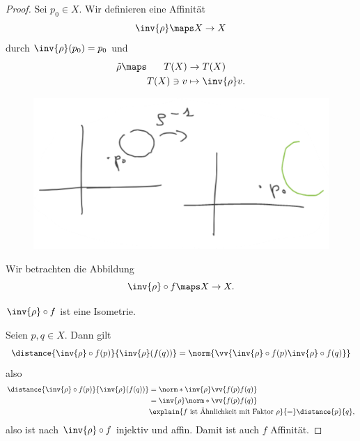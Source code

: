 \begin{proof}
  Sei \( p_0\in X \). Wir definieren eine Affinität
  \begin{equation*}
    \inv{\rho}\maps X\to X
  \end{equation*}
  durch \( \inv{\rho}(p_0)=p_0 \) und
  \begin{equation*}
    \tilde{\rho}\maps \begin{aligned}[t]
      T(X)&\to T(X)\\
      T(X)\ni v&\mapsto \inv{\rho}v.
    \end{aligned}
  \end{equation*}
  \begin{figure}[H]
    \centering
    \includegraphics[width=0.5\linewidth]{figures/aehnlichkeiten_sind_affinitaeten_beweis}
    \label{fig:aehnlichkeiten_sind_affinitaeten_beweis}
  \end{figure}
  Wir betrachten die Abbildung
  \begin{equation*}
    \inv{\rho}\circ f\maps X\to X.
  \end{equation*}
  \begin{behauptung*}
    \( \inv{\rho}\circ f \) ist eine Isometrie.
  \end{behauptung*}
  Seien \( p,q\in X \). Dann gilt
  \begin{equation*}
    \distance{\inv{\rho}\circ f(p)}{\inv{\rho}(f(q))}=\norm{\vv{\inv{\rho}\circ f(p) \inv{\rho}\circ f(q)}}
  \end{equation*}
  also
  \begin{align*}
    \distance{\inv{\rho}\circ f(p)}{\inv{\rho}(f(q))}&=\norm*{\inv{\rho}\vv{f(p)f(q)}}\\
    &=\inv{\rho}\norm*{\vv{f(p)f(q)}}\\
    &\explain{\text{\( f \) ist Ähnlichkeit mit Faktor \( \rho \)}}{=}\distance{p}{q},
  \end{align*}
  also ist nach  \( \inv{\rho}\circ f \) injektiv und affin. Damit ist auch \( f \) Affinität.
\end{proof}